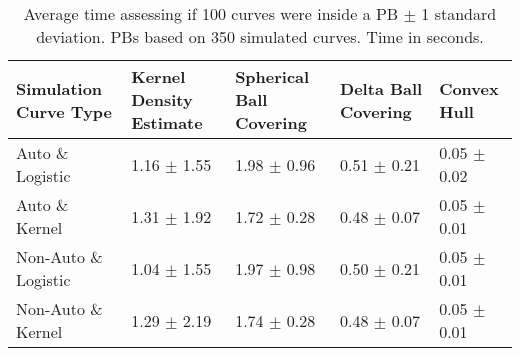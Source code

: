 \begin{table}[ht!]
\centering
\begin{tabular}{|R{1.2in}||L{.95in}L{.9in}|L{.8in}L{.8in}|}
  \hline
Simulation Curve Type & Kernel Density Estimate & Spherical Ball Covering & Delta Ball Covering & Convex Hull \\ 
  \hline
Auto \& Logistic & 1.16 \(\pm\) 1.55 & 1.98 \(\pm\) 0.96 & 0.51 \(\pm\) 0.21 & 0.05 \(\pm\) 0.02 \\ 
  Auto \& Kernel & 1.31 \(\pm\) 1.92 & 1.72 \(\pm\) 0.28 & 0.48 \(\pm\) 0.07 & 0.05 \(\pm\) 0.01 \\ 
  Non-Auto \& Logistic & 1.04 \(\pm\) 1.55 & 1.97 \(\pm\) 0.98 & 0.50 \(\pm\) 0.21 & 0.05 \(\pm\) 0.01 \\ 
  Non-Auto \& Kernel & 1.29 \(\pm\) 2.19 & 1.74 \(\pm\) 0.28 & 0.48 \(\pm\) 0.07 & 0.05 \(\pm\) 0.01 \\ 
   \hline
\end{tabular}
\caption{Average time assessing if 100 curves were inside a PB \(\pm\) 1 standard deviation. PBs based on 350 simulated curves. Time in seconds.} 
\label{tab:time_prediction100}
\end{table}
